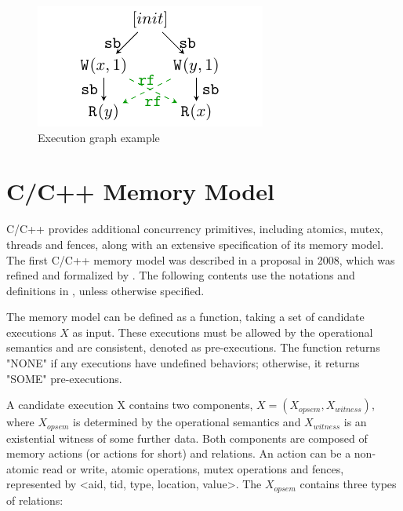 \begin{figure}[h!tbp]
	\centering
	\includegraphics[scale=1]{figure/exec-graph/example.pdf} 
	\caption{Execution graph example} 
	\label{graph-example} 
\end{figure}







\section{C/C++ Memory Model}
C/C++ provides additional concurrency primitives, including atomics, mutex, threads and fences, along with an extensive specification of its memory model.
The first C/C++ memory model was described in a proposal\cite{c++model-proposal} in 2008, which was refined and formalized by \cite{c++model}. The following contents use the notations and definitions in \cite{c++model}, unless otherwise specified.

The memory model can be defined as a function, taking a set of candidate executions $X$ as input. These executions must be allowed by the operational semantics and are consistent, denoted as pre-executions. The function returns "NONE" if any executions have undefined behaviors; otherwise, it returns "SOME" pre-executions.

A candidate execution X contains two components, $X = (X_{opsem}, X_{witness})$, where $X_{opsem}$ is determined by the operational semantics and $X_{witness}$ is an existential witness of some further data. Both components are composed of memory actions (or actions for short) and relations. An action can be a non-atomic read or write, atomic operations, mutex operations and fences, represented by <aid, tid, type, location, value>. The $X_{opsem}$ contains three types of relations:

